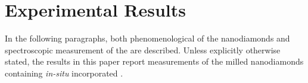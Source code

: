
\chapter{Experimental Results}	\label{ch::results}

In the following paragraphs, both phenomenological of the nanodiamonds and spectroscopic measurement of the \sivs are described.
Unless explicitly otherwise stated, the results in this paper report measurements of the milled nanodiamonds containing \textit{in-situ} incorporated \sivs.

	
	
	
	
	
	
